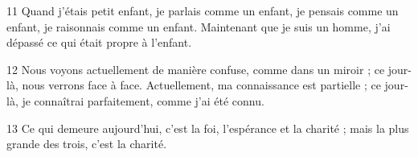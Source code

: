 
11 Quand j’étais petit enfant, je parlais comme un enfant, je pensais comme un enfant, je raisonnais comme un enfant. Maintenant que je suis un homme, j’ai dépassé ce qui était propre à l’enfant.

12 Nous voyons actuellement de manière confuse, comme dans un miroir ; ce jour-là, nous verrons face à face. Actuellement, ma connaissance est partielle ; ce jour-là, je connaîtrai parfaitement, comme j’ai été connu.

13 Ce qui demeure aujourd’hui, c’est la foi, l’espérance et la charité ; mais la plus grande des trois, c’est la charité.